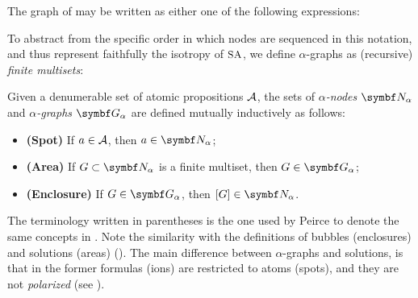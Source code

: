 \begin{example}
The graph of  may be written as either one of the
following expressions:
\end{example}

To abstract from the specific order in which nodes are sequenced in this
notation, and thus represent faithfully the isotropy of $\small\textsc{SA}$, we define
$\alpha$-graphs as (recursive) \emph{finite multisets}:

\begin{definition} 
  
  Given a denumerable set of atomic propositions $\mathcal{A}$, the sets of
  \emph{$\alpha$-nodes} $\anodes$ and \emph{$\alpha$-graphs} $\agraphs$ are
  defined mutually inductively as follows:
  \begin{itemize}
    \item \textbf{(Spot)} If $a \in \mathcal{A}$, then $a \in \anodes$;
    \item \textbf{(Area)} If $G \subset \anodes$ is a finite multiset, then $G
    \in \agraphs$;
    \item \textbf{(Enclosure)} If $G \in \agraphs$, then $[G] \in \anodes$.
  \end{itemize}
\end{definition}
The terminology written in parentheses is the one used by Peirce to denote the
same concepts in . Note the similarity with
the definitions of bubbles (enclosures) and solutions (areas)
(). The main difference between $\alpha$-graphs and solutions,
is that in the former formulas (ions) are restricted to atoms (spots), and they
are not \emph{polarized} (see ).


